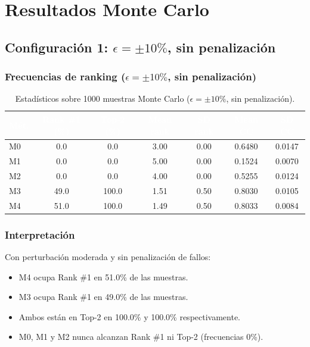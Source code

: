 \documentclass[12pt,a4paper,oneside]{book}
\begin{document}
\newpage
\section{Resultados Monte Carlo}

\subsection{Configuración 1: $\epsilon = \pm 10\%$, sin penalización}

\subsubsection*{Frecuencias de ranking ($\epsilon = \pm 10\%$, sin penalización)}
\begin{table}[H]
\centering
\caption{Estadísticos sobre 1000 muestras Monte Carlo ($\epsilon = \pm 10\%$, sin penalización).}
\renewcommand{\arraystretch}{1.3}
\begin{tabular}{lcccccc}
\toprule
\rowcolor{primary}
\textcolor{white}{\textbf{Mét.}} & \textcolor{white}{\textbf{Rank \#1 (\%)}} & \textcolor{white}{\textbf{Top-2 (\%)}} & \textcolor{white}{\textbf{Mean rank}} & \textcolor{white}{\textbf{SD rank}} & \textcolor{white}{\textbf{Mean CC}} & \textcolor{white}{\textbf{SD CC}} \\
\midrule
M0 & 0.0 & 0.0 & 3.00 & 0.00 & 0.6480 & 0.0147 \\
M1 & 0.0 & 0.0 & 5.00 & 0.00 & 0.1524 & 0.0070 \\
M2 & 0.0 & 0.0 & 4.00 & 0.00 & 0.5255 & 0.0124 \\
M3 & 49.0 & 100.0 & 1.51 & 0.50 & 0.8030 & 0.0105 \\
M4 & 51.0 & 100.0 & 1.49 & 0.50 & 0.8033 & 0.0084 \\
\bottomrule
\end{tabular}
\end{table}

\subsubsection*{Interpretación}

Con perturbación moderada y sin penalización de fallos:
\begin{itemize}
    \item M4 ocupa Rank \#1 en 51.0\% de las muestras.
    \item M3 ocupa Rank \#1 en 49.0\% de las muestras.
    \item Ambos están en Top-2 en 100.0\% y 100.0\% respectivamente.
    \item M0, M1 y M2 nunca alcanzan Rank \#1 ni Top-2 (frecuencias 0\%).
\end{itemize}
\end{document}
